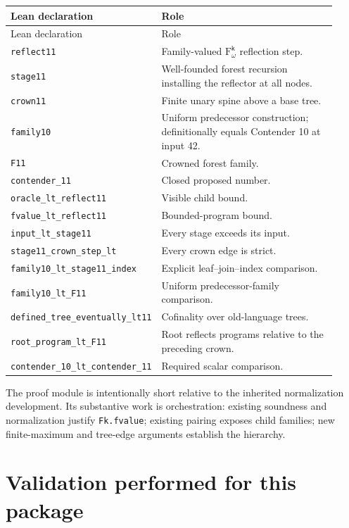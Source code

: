 \documentclass[11pt]{article}
\theoremstyle{definition}
\theoremstyle{remark}
\newcommand{\Fk}{\mathrm{F}_{\omega}^{\mathsf{k}}}
\newcommand{\code}[1]{\texttt{#1}}
\begin{document}
\begin{longtable}{p{0.34\linewidth}p{0.58\linewidth}}
\toprule
Lean declaration & Role \\
\midrule
\endfirsthead
\toprule
Lean declaration & Role \\
\midrule
\endhead
\code{reflect11} & Family-valued $\Fk$ reflection step. \\
\code{stage11} & Well-founded forest recursion installing the reflector at
all nodes. \\
\code{crown11} & Finite unary spine above a base tree. \\
\code{family10} & Uniform predecessor construction; definitionally equals
Contender 10 at input 42. \\
\code{F11} & Crowned forest family. \\
\code{contender\_11} & Closed proposed number. \\
\code{oracle\_lt\_reflect11} & Visible child bound. \\
\code{fvalue\_lt\_reflect11} & Bounded-program bound. \\
\code{input\_lt\_stage11} & Every stage exceeds its input. \\
\code{stage11\_crown\_step\_lt} & Every crown edge is strict. \\
\code{family10\_lt\_stage11\_index} & Explicit leaf--join--index comparison. \\
\code{family10\_lt\_F11} & Uniform predecessor-family comparison. \\
\code{defined\_tree\_eventually\_lt11} & Cofinality over old-language trees. \\
\code{root\_program\_lt\_F11} & Root reflects programs relative to the
preceding crown. \\
\code{contender\_10\_lt\_contender\_11} & Required scalar comparison. \\
\bottomrule
\end{longtable}

The proof module is intentionally short relative to the inherited
normalization development.  Its substantive work is orchestration: existing
soundness and normalization justify \code{Fk.fvalue}; existing pairing exposes
child families; new finite-maximum and tree-edge arguments establish the
hierarchy.

\section{Validation performed for this package}
\end{document}
